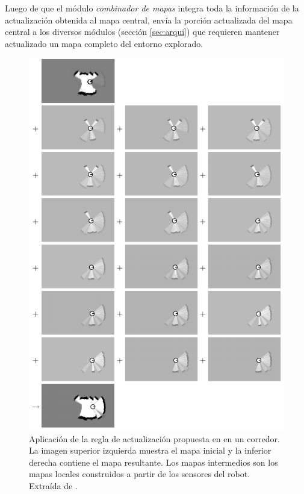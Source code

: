Luego de que el módulo \emph{combinador de mapas} integra toda la información
de la actualización obtenida al mapa central, envía la porción actualizada del
mapa central a los diversos módulos (sección \ref{sec:arqui}) que requieren
mantener actualizado un mapa completo del entorno explorado.

\begin{figure}[H]
  \center
  \includegraphics[width=0.80\linewidth]{imagenes/occgridUpdate.png}
  \caption[Aplicación de la regla de actualización propuesta en
  \cite{stachniss2009robotic} en un corredor.]{Aplicación de la
    regla de actualización propuesta en \cite{stachniss2009robotic} en un
    corredor. La imagen superior izquierda muestra el mapa inicial y
    la inferior derecha contiene el mapa resultante. Los mapas intermedios son los
    mapas locales construidos a partir de los sensores del robot. Extraída de
  \cite{stachniss2009robotic}. }
  \label{fig:mappingUpRule}
\end{figure} 




